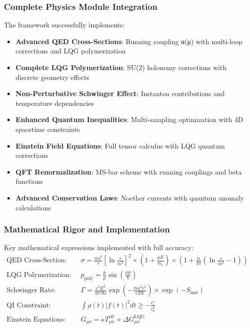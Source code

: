 \documentclass[11pt]{article}
\begin{document}
\subsubsection{Complete Physics Module Integration}
The framework successfully implements:
\begin{itemize}
\item \textbf{Advanced QED Cross-Sections}: Running coupling α(μ) with multi-loop corrections and LQG polymerization
\item \textbf{Complete LQG Polymerization}: SU(2) holonomy corrections with discrete geometry effects  
\item \textbf{Non-Perturbative Schwinger Effect}: Instanton contributions and temperature dependencies
\item \textbf{Enhanced Quantum Inequalities}: Multi-sampling optimization with 4D spacetime constraints
\item \textbf{Einstein Field Equations}: Full tensor calculus with LQG quantum corrections
\item \textbf{QFT Renormalization}: MS-bar scheme with running couplings and beta functions
\item \textbf{Advanced Conservation Laws}: Noether currents with quantum anomaly calculations
\end{itemize}

\subsubsection{Mathematical Rigor and Implementation}
Key mathematical expressions implemented with full accuracy:
\begin{align}
\text{QED Cross-Section:} \quad &\sigma = \frac{\pi\alpha^2}{s}\left[\ln\frac{s}{m^2}\right]^2 \times \left(1 + \frac{\mu E}{m_e}\right) \times \left(1 + \frac{\alpha}{4\pi}\left(\ln\frac{s}{m^2} - 1\right)\right) \\
\text{LQG Polymerization:} \quad &p_{\text{poly}} = \frac{\hbar}{\mu}\sin\left(\frac{\mu p}{\hbar}\right) \\
\text{Schwinger Rate:} \quad &\Gamma = \frac{e^2E^2}{4\pi^3\hbar c}\exp\left(-\frac{\pi m^2c^3}{eE\hbar}\right) \times \exp(-S_{\text{inst}}) \\
\text{QI Constraint:} \quad &\int \rho(t)|f(t)|^2 dt \geq -\frac{C}{t_0^4} \\
\text{Einstein Equations:} \quad &G_{\mu\nu} = \kappa T_{\mu\nu}^{\text{eff}} + \Delta G_{\mu\nu}^{\text{LQG}}
\end{align}
\end{document}
